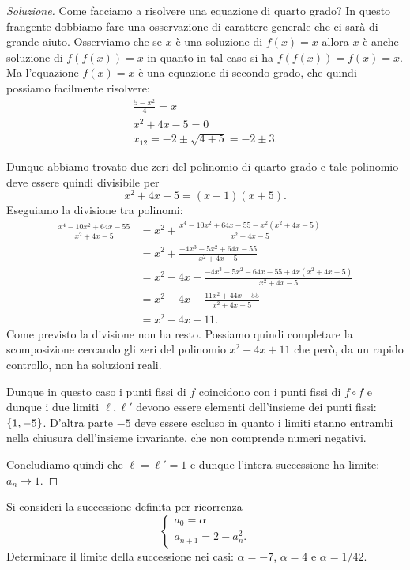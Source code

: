 \begin{proof}[Soluzione]
Come facciamo a risolvere una equazione di quarto grado?
In questo frangente dobbiamo fare una osservazione di carattere
generale che ci sarà di grande aiuto.
Osserviamo che se $x$ è una soluzione di $f(x)=x$ allora $x$
è anche soluzione di $f(f(x)) = x$ in quanto in tal caso si ha
$f(f(x))=f(x)=x$.
Ma l'equazione $f(x) = x$ è una equazione di secondo grado, che quindi
possiamo facilmente risolvere:
\begin{gather*}
  \frac{5-x^2}{4} = x \\
  x^2 + 4x - 5 = 0 \\
  x_{12} = -2 \pm \sqrt{4 + 5} = -2 \pm 3.
\end{gather*}

Dunque abbiamo trovato due zeri del polinomio di quarto grado e
tale polinomio deve essere quindi divisibile per
\[
 x^2 + 4x - 5 = (x-1)(x+5).
\]
Eseguiamo la divisione tra polinomi:
\begin{align*}
\frac{x^4 - 10 x^2 + 64 x - 55}{x^2 + 4x - 5}
&= x^2 + \frac{x^4 - 10 x^2 + 64x - 55 - x^2 (x^2 + 4x - 5)}{x^2+4x-5}\\
&= x^2 + \frac{-4x^3 - 5 x^2 + 64 x - 55}{x^2+4x-5}\\
&= x^2 - 4x + \frac{-4x^3 - 5x^2 - 64 x - 55 + 4x(x^2+4x-5)}{x^2+4x-5}
\\
&= x^2 - 4x + \frac{11 x^2 + 44 x - 55}{x^2 + 4x -5}\\
&= x^2 - 4x + 11.
\end{align*}
Come previsto la divisione non ha resto. Possiamo quindi completare la
scomposizione cercando gli zeri del polinomio $x^2-4x+11$ che però, da
un rapido controllo, non ha soluzioni reali.

Dunque in questo caso i punti fissi di $f$ coincidono con i punti
fissi di $f\circ f$ e dunque i due limiti $\ell, \ell'$ devono essere
elementi dell'insieme dei punti fissi: ${\left\{ 1, -5 \right\}}$. D'altra parte $-5$
deve essere escluso in quanto i limiti stanno entrambi nella chiusura
dell'insieme invariante, che non comprende numeri negativi.

Concludiamo quindi che $\ell = \ell' = 1$ e dunque l'intera
successione ha limite: $a_n \to 1$.
\end{proof}

\begin{exercise}\label{ex_7}
  Si consideri la successione definita per ricorrenza
  \[
  \begin{cases}
    a_0 = \alpha\\
    a_{n+1} = 2- a_n^2.
  \end{cases}
  \]
  Determinare il limite della successione nei casi: $\alpha=-7$, $\alpha=4$ e $\alpha=1/42$.
\end{exercise}


